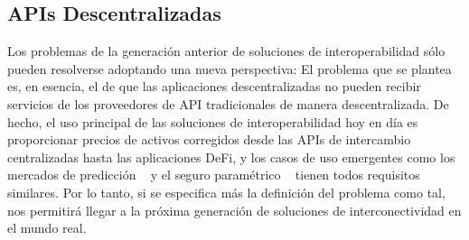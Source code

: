 \documentclass[11pt]{article}
\begin{document}
\subsection{APIs Descentralizadas}
\label{sec:decentralized-apis}

Los problemas de la generación anterior de soluciones de interoperabilidad sólo pueden resolverse adoptando una nueva perspectiva: El problema que se plantea es, en esencia, el de que las aplicaciones descentralizadas no pueden recibir servicios de los proveedores de API tradicionales de manera descentralizada. De hecho, el uso principal de las soluciones de interoperabilidad hoy en día es proporcionar precios de activos corregidos desde las APIs de intercambio centralizadas hasta las aplicaciones DeFi, y los casos de uso emergentes como los mercados de predicción ~\cite{omen} 
y el seguro paramétrico ~\cite{capgemini:2019b} tienen todos requisitos similares. 
Por lo tanto, si se especifica más la definición del problema como tal, nos permitirá llegar a la próxima generación de soluciones de interconectividad en el mundo real. 
\end{document}
